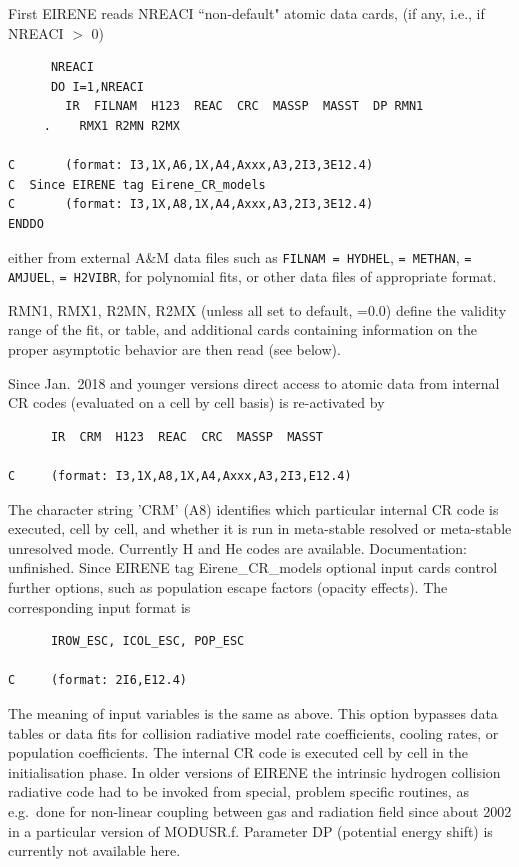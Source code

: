 First EIRENE reads NREACI ``non-default" atomic data cards, (if any, i.e., if
NREACI $>$ 0)

\begin{lstlisting}
      NREACI
      DO I=1,NREACI
        IR  FILNAM  H123  REAC  CRC  MASSP  MASST  DP RMN1
     .    RMX1 R2MN R2MX

C       (format: I3,1X,A6,1X,A4,Axxx,A3,2I3,3E12.4)
C  Since EIRENE tag Eirene_CR_models
C       (format: I3,1X,A8,1X,A4,Axxx,A3,2I3,3E12.4)
ENDDO
\end{lstlisting}

either from external A\&M data files such as \lstinline|FILNAM = HYDHEL|,
\lstinline|= METHAN|, \lstinline|= AMJUEL|, \lstinline|= H2VIBR|, for
polynomial fits, or other data files of appropriate format.

RMN1, RMX1, R2MN, R2MX	(unless all set to default, =0.0) define the validity
range of the fit, or table, and additional cards containing information on the
proper asymptotic behavior are then read (see below).

Since Jan.\ 2018 and younger versions direct access to atomic data from
internal CR codes (evaluated on a cell by cell basis) is re-activated by

\begin{lstlisting}
      IR  CRM  H123  REAC  CRC  MASSP  MASST

C     (format: I3,1X,A8,1X,A4,Axxx,A3,2I3,E12.4)
\end{lstlisting}

The character string 'CRM'  (A8) identifies which particular internal CR
code is executed, cell by cell, and whether it is run in meta-stable resolved
or meta-stable unresolved mode.
Currently H and He codes are available.
Documentation: unfinished.
Since EIRENE tag Eirene\_CR\_models optional input cards control
further options, such as population escape factors (opacity effects).
The corresponding input format is

\begin{lstlisting}
      IROW_ESC, ICOL_ESC, POP_ESC

C     (format: 2I6,E12.4)
\end{lstlisting}


The meaning of input variables is the same as above.
This option bypasses data tables or data fits for collision radiative model
rate coefficients, cooling rates, or population coefficients.
The internal CR code is executed cell by cell in the initialisation phase.
In older versions of EIRENE the intrinsic hydrogen collision radiative code had
to be invoked from special, problem specific routines, as e.g.\ done for
non-linear coupling between gas and radiation field since about 2002 in a
particular version of MODUSR.f.
Parameter DP (potential energy shift) is currently not available here.

